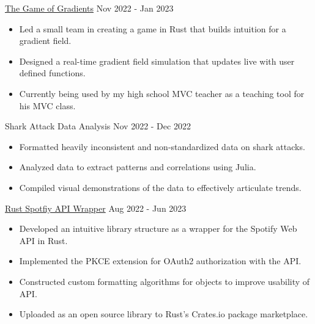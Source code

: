 \documentclass[9pt]{resume}
\begin{document}
    \vspace{-0.4cm}
    \begin{experiencelist}
        \experiencenocompany
            {\href{https://github.com/TheSharkhead2/The_Game_of_Gradients}{The Game of Gradients}}
            {Nov 2022 - Jan 2023}
            {\begin{itemize}[noitemsep, topsep=1pt] 
                \item Led a small team in creating a game in Rust that builds intuition for a gradient field.
                \item Designed a real-time gradient field simulation that updates live with user defined functions. 
                \item Currently being used by my high school MVC teacher as a teaching tool for his MVC class. 
            \end{itemize}}
        \experiencenocompany 
            {Shark Attack Data Analysis}
            {Nov 2022 - Dec 2022}
            {\begin{itemize}[noitemsep, topsep=1pt]
                \item Formatted heavily inconsistent and non-standardized data on shark attacks.
                \item Analyzed data to extract patterns and correlations using Julia. 
                \item Compiled visual demonstrations of the data to effectively articulate trends. 
            \end{itemize}}
        \experiencenocompany
            {\href{https://github.com/TheSharkhead2/spotify.rs}{Rust Spotfiy API Wrapper}}
            {Aug 2022 - Jun 2023}
            {\begin{itemize}[noitemsep, topsep=1pt]
                \item Developed an intuitive library structure as a wrapper for the Spotify Web API in Rust. 
                \item Implemented the PKCE extension for OAuth2 authorization with the API. 
                \item Constructed custom formatting algorithms for objects to improve usability of API.
                \item Uploaded as an open source library to Rust's Crates.io package marketplace.
            \end{itemize}}

\end{experiencelist}
\end{document}
